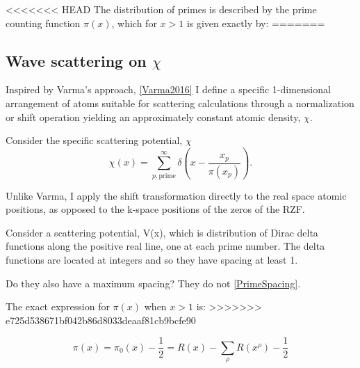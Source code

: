 \documentclass[11pt, oneside]{article}
\begin{document}
<<<<<<< HEAD
The distribution of primes is described by the prime counting function $\pi(x)$, which for $x > 1$ is given exactly by:
=======




\subsection{Wave scattering on $\chi$}
Inspired by Varma's approach, \ref{Varma2016} I define a specific 1-dimensional arrangement of atoms suitable for scattering calculations through a normalization or shift operation yielding an approximately constant atomic density, $\chi$.

Consider the specific scattering potential, $\chi$
\begin{equation}
\chi(x) = \sum_{p, \text{prime}}^{\infty} \delta(x - \frac{x_p}{\pi(x_p)}).
\end{equation}


Unlike Varma, I apply the shift transformation directly to the real space atomic positions, as opposed to the k-space positions of the zeros of the RZF.

Consider a scattering potential, V(x), which is distribution of Dirac delta functions along the positive real line, one at each prime number. 
The delta functions are located at integers and so they have spacing at least 1.

Do they also have a maximum spacing? They do not \ref{PrimeSpacing}.

The exact expression \cite{Riemann} for $\pi(x)$ when $x>1$ is:
>>>>>>> e725d538671bf042b86d8033deaaf81cb9bcfe90

\begin{equation}
\pi(x) = \pi_0(x) - \frac{1}{2} = R(x) - \sum_{\rho}R(x^{\rho}) - \frac{1}{2}
\end{equation}
\end{document}
